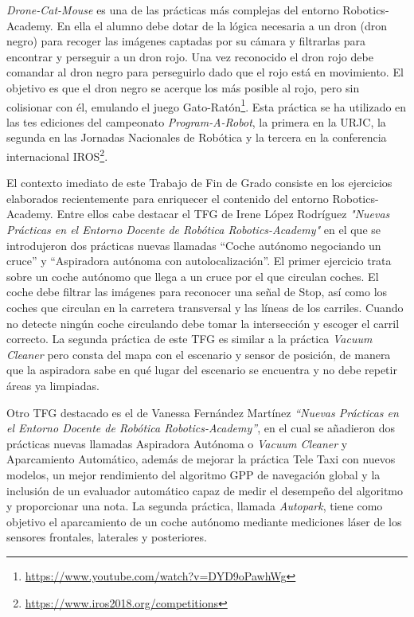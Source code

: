 \textit{Drone-Cat-Mouse} es una de las prácticas más complejas del entorno Robotics-Academy. En ella el alumno debe dotar de la lógica necesaria a un dron (dron negro) para recoger las imágenes captadas por su cámara y filtrarlas para encontrar y perseguir a un dron rojo. Una vez reconocido el dron rojo debe comandar al dron negro para perseguirlo dado que el rojo está en movimiento. El objetivo es que el dron negro se acerque los más posible al rojo, pero sin colisionar con él, emulando el juego Gato-Ratón\footnote{\url{https://www.youtube.com/watch?v=DYD9oPawhWg}}. Esta práctica se ha utilizado en las tes ediciones del campeonato \textit{Program-A-Robot}, la primera en la URJC, la segunda en las Jornadas Nacionales de Robótica y la tercera en la conferencia internacional IROS\footnote{\url{https://www.iros2018.org/competitions}}.

El contexto imediato de este Trabajo de Fin de Grado consiste en los ejercicios elaborados recientemente para enriquecer el contenido del entorno Robotics-Academy. Entre ellos cabe destacar el TFG de Irene López Rodríguez \textit{"Nuevas Prácticas en el Entorno Docente de Robótica Robotics-Academy"}\cite{tfg1} en el que se introdujeron dos prácticas nuevas llamadas ``Coche autónomo negociando un cruce'' y ``Aspiradora autónoma con autolocalización''. El primer ejercicio trata sobre un coche autónomo que llega a un cruce por el que circulan coches. El coche debe filtrar las imágenes para reconocer una señal de Stop, así como los coches que circulan en la carretera transversal y las líneas de los carriles. Cuando no detecte ningún coche circulando debe tomar la intersección y escoger el carril correcto. La segunda práctica de este TFG es similar a la práctica \textit{Vacuum Cleaner} pero consta del mapa con el escenario y sensor de posición, de manera que la aspiradora sabe en qué lugar del escenario se encuentra y no debe repetir áreas ya limpiadas.

Otro TFG destacado es el de Vanessa Fernández Martínez \textit{{“Nuevas Prácticas en el Entorno Docente de Robótica Robotics-Academy”}}\cite{tfg2}, en el cual se añadieron dos prácticas nuevas llamadas Aspiradora Autónoma o \textit{Vacuum Cleaner} y Aparcamiento Automático, además de mejorar la práctica Tele Taxi con nuevos modelos, un mejor rendimiento del algoritmo GPP de navegación global y la inclusión de un evaluador automático capaz de medir el desempeño del algoritmo y proporcionar una nota. La segunda práctica, llamada \textit{Autopark}, tiene como objetivo el aparcamiento de un coche autónomo mediante mediciones láser de los sensores frontales, laterales y posteriores.

